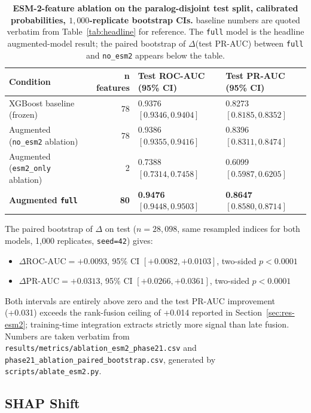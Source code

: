 \documentclass[11pt,a4paper,oneside]{report}
\begin{document}
\begin{table}[H]
\centering
\caption[ESM-2-feature ablation]{\textbf{ESM-2-feature ablation on the
paralog-disjoint test split, calibrated probabilities,
$1{,}000$-replicate bootstrap CIs.} baseline numbers are quoted
verbatim from Table~\ref{tab:headline} for reference. The
\texttt{full} model is the headline augmented-model result; the paired
bootstrap of $\Delta$(test PR-AUC) between \texttt{full} and
\texttt{no\_esm2} appears below the table.}
\label{tab:phase21-ablation}
\small
\begin{tabular}{@{} l r l l @{}}
\toprule
\textbf{Condition} & \textbf{n features} & \textbf{Test ROC-AUC (95\% CI)} & \textbf{Test PR-AUC (95\% CI)} \\
\midrule
XGBoost baseline (frozen)        & 78 & 0.9376 $[0.9346, 0.9404]$ & 0.8273 $[0.8185, 0.8352]$ \\
Augmented (\texttt{no\_esm2} ablation)      & 78 & 0.9386 $[0.9355, 0.9416]$ & 0.8396 $[0.8311, 0.8474]$ \\
Augmented (\texttt{esm2\_only} ablation)    &  2 & 0.7388 $[0.7314, 0.7458]$ & 0.6099 $[0.5987, 0.6205]$ \\
\rowcolor{green!8}
\textbf{Augmented \texttt{full}} &\textbf{80} &\textbf{0.9476 $[0.9448, 0.9503]$} &\textbf{0.8647 $[0.8580, 0.8714]$} \\
\bottomrule
\end{tabular}
\end{table}

The paired bootstrap of $\Delta$ on test ($n=28{,}098$, same
resampled indices for both models, 1{,}000 replicates,
\texttt{seed=42}) gives:
\begin{itemize}[leftmargin=2em, itemsep=0.1em]
\item $\Delta\text{ROC-AUC} = +0.0093$, 95\% CI $[+0.0082, +0.0103]$, two-sided $p < 0.0001$
\item $\Delta\text{PR-AUC} = +0.0313$, 95\% CI $[+0.0266, +0.0361]$, two-sided $p < 0.0001$
\end{itemize}
Both intervals are entirely above zero and the test PR-AUC
improvement (+0.031) exceeds the rank-fusion ceiling of +0.014
reported in Section~\ref{sec:res-esm2}; training-time integration
extracts strictly more signal than late fusion. Numbers are taken
verbatim from
\texttt{results/metrics/ablation\_esm2\_phase21.csv} and
\texttt{phase21\_ablation\_paired\_bootstrap.csv}, generated by
\texttt{scripts/ablate\_esm2.py}.

\subsection{SHAP Shift}
\label{sec:phase21-shap}
\end{document}
